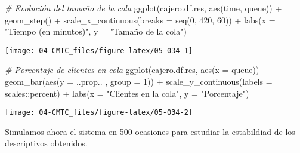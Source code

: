 \documentclass[
]{book}
\newenvironment{Shaded}{\begin{snugshade}}{\end{snugshade}}
\newcommand{\AttributeTok}[1]{\textcolor[rgb]{0.77,0.63,0.00}{#1}}
\newcommand{\CommentTok}[1]{\textcolor[rgb]{0.56,0.35,0.01}{\textit{#1}}}
\newcommand{\DecValTok}[1]{\textcolor[rgb]{0.00,0.00,0.81}{#1}}
\newcommand{\FunctionTok}[1]{\textcolor[rgb]{0.00,0.00,0.00}{#1}}
\newcommand{\NormalTok}[1]{#1}
\newcommand{\SpecialCharTok}[1]{\textcolor[rgb]{0.00,0.00,0.00}{#1}}
\newcommand{\StringTok}[1]{\textcolor[rgb]{0.31,0.60,0.02}{#1}}
\theoremstyle{definition}
\theoremstyle{definition}
\theoremstyle{definition}
\theoremstyle{definition}
\theoremstyle{remark}
\begin{document}
\begin{Shaded}
\begin{Highlighting}[]
\CommentTok{\# Evolución del tamaño de la cola}
\FunctionTok{ggplot}\NormalTok{(cajero.df.res, }\FunctionTok{aes}\NormalTok{(time, queue)) }\SpecialCharTok{+}
  \FunctionTok{geom\_step}\NormalTok{() }\SpecialCharTok{+}
  \FunctionTok{scale\_x\_continuous}\NormalTok{(}\AttributeTok{breaks =} \FunctionTok{seq}\NormalTok{(}\DecValTok{0}\NormalTok{, }\DecValTok{420}\NormalTok{, }\DecValTok{60}\NormalTok{)) }\SpecialCharTok{+} 
  \FunctionTok{labs}\NormalTok{(}\AttributeTok{x =} \StringTok{"Tiempo (en minutos)"}\NormalTok{, }\AttributeTok{y =} \StringTok{"Tamaño de la cola"}\NormalTok{)}
\end{Highlighting}
\end{Shaded}

\begin{center}\texttt{[image: 04-CMTC\_files/figure-latex/05-034-1]} \end{center}

\begin{Shaded}
\begin{Highlighting}[]
\CommentTok{\# Porcentaje de clientes en cola}
\FunctionTok{ggplot}\NormalTok{(cajero.df.res, }\FunctionTok{aes}\NormalTok{(}\AttributeTok{x =}\NormalTok{ queue)) }\SpecialCharTok{+} 
  \FunctionTok{geom\_bar}\NormalTok{(}\FunctionTok{aes}\NormalTok{(}\AttributeTok{y =}\NormalTok{ ..prop.. , }\AttributeTok{group =} \DecValTok{1}\NormalTok{)) }\SpecialCharTok{+} 
  \FunctionTok{scale\_y\_continuous}\NormalTok{(}\AttributeTok{labels =}\NormalTok{ scales}\SpecialCharTok{::}\NormalTok{percent) }\SpecialCharTok{+} 
  \FunctionTok{labs}\NormalTok{(}\AttributeTok{x =} \StringTok{"Clientes en la cola"}\NormalTok{, }\AttributeTok{y =} \StringTok{"Porcentaje"}\NormalTok{)}
\end{Highlighting}
\end{Shaded}

\begin{center}\texttt{[image: 04-CMTC\_files/figure-latex/05-034-2]} \end{center}

Simulamos ahora el sistema en 500 ocasiones para estudiar la estabildiad de los descriptivos obtenidos.
\end{document}
